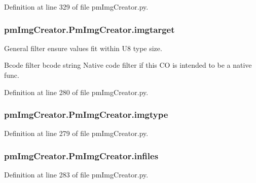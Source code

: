 Definition at line 329 of file pm\-Img\-Creator.\-py.

\hypertarget{classpm_img_creator_1_1_pm_img_creator_a2972be9fecc5ce9a934e2f87a611ab53}{
\subsubsection[{imgtarget}]{\setlength{\rightskip}{0pt plus 5cm}pm\-Img\-Creator.\-Pm\-Img\-Creator.\-imgtarget}}\label{classpm_img_creator_1_1_pm_img_creator_a2972be9fecc5ce9a934e2f87a611ab53}


General filter ensure values fit within U8 type size. 

Bcode filter bcode string Native code filter if this C\-O is intended to be a native func. 

Definition at line 280 of file pm\-Img\-Creator.\-py.

\hypertarget{classpm_img_creator_1_1_pm_img_creator_af82fbdbae4c8da3e2a1bb2cccd172926}{
\subsubsection[{imgtype}]{\setlength{\rightskip}{0pt plus 5cm}pm\-Img\-Creator.\-Pm\-Img\-Creator.\-imgtype}}\label{classpm_img_creator_1_1_pm_img_creator_af82fbdbae4c8da3e2a1bb2cccd172926}


Definition at line 279 of file pm\-Img\-Creator.\-py.

\hypertarget{classpm_img_creator_1_1_pm_img_creator_a827499b441df4df8ea1d60f8ae1e4827}{
\subsubsection[{infiles}]{\setlength{\rightskip}{0pt plus 5cm}pm\-Img\-Creator.\-Pm\-Img\-Creator.\-infiles}}\label{classpm_img_creator_1_1_pm_img_creator_a827499b441df4df8ea1d60f8ae1e4827}


Definition at line 283 of file pm\-Img\-Creator.\-py.

